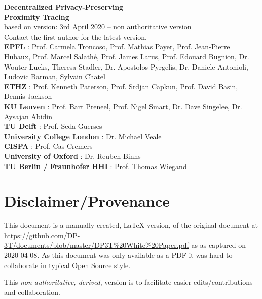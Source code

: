 \documentclass[12pt,a4paper]{article}
\begin{document}
\thispagestyle{specialfooter}
\onehalfspace
\begin{center}{\bfseries\Large
Decentralized Privacy-Preserving\\
Proximity Tracing}\\[0.5cm]
 based on version: 3rd April 2020 -- non authoritative version \\
Contact the first author for the latest version.\\[1cm]
\textbf{EPFL} : Prof. Carmela Troncoso, Prof. Mathias Payer, Prof. Jean-Pierre\\
Hubaux, Prof. Marcel Salathé, Prof. James Larus, Prof. Edouard
Bugnion, Dr. Wouter Lueks, Theresa Stadler, Dr. Apostolos Pyrgelis, Dr.
Daniele Antonioli, Ludovic Barman, Sylvain Chatel\\[0.3cm]
\textbf{ETHZ} : Prof. Kenneth Paterson, Prof. Srdjan Capkun, Prof. David Basin,
Dennis Jackson\\[0.3cm]
\textbf{KU Leuven} : Prof. Bart Preneel, Prof. Nigel Smart, Dr. Dave Singelee,
Dr. Aysajan Abidin\\[0.3cm]
\textbf{TU Delft} : Prof. Seda Guerses\\[0.3cm]
\textbf{University College London} : Dr. Michael Veale\\[0.3cm]
\textbf{CISPA} : Prof. Cas Cremers\\[0.3cm]
\textbf{University of Oxford} : Dr. Reuben Binns\\[0.3cm]
\textbf{TU Berlin / Fraunhofer HHI} : Prof. Thomas Wiegand
\end{center}
\clearpage
\singlespace

\section*{Disclaimer/Provenance}

This document is a manually created, LaTeX version, of the original document at \url{https://github.com/DP-3T/documents/blob/master/DP3T\%20White\%20Paper.pdf} as 
as captured on 2020-04-08. As this document was only available as a PDF it was hard to collaborate in typical Open Source style.

This\emph{ non-authoritative, derived}, version is to facilitate easier edits/contributions and collaboration.
\end{document}
